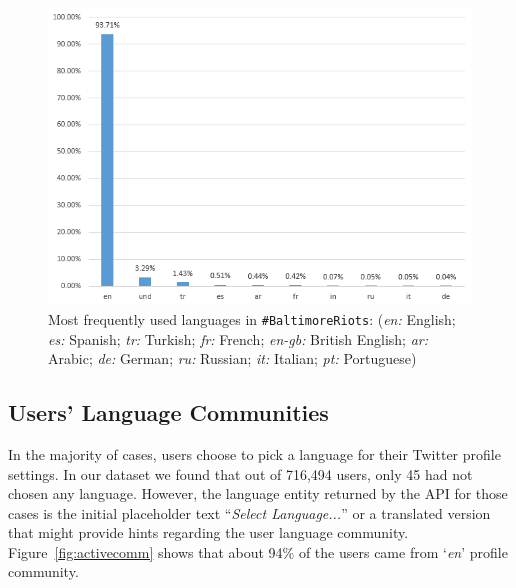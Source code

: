\documentclass[conference]{IEEEtran}
\begin{document}
\begin{figure}[!htb]
\centering
\includegraphics[width=\columnwidth]{images/langfreq.png}
\caption{Most frequently used languages in
  {\texttt{\#BaltimoreRiots}}: 
({\emph{en:}} English; {\emph{es:}} Spanish; {\emph{tr:}} Turkish;
  {\emph{fr:}} French; {\emph{en-gb:}} British English; {\emph{ar:}}
  Arabic; {\emph{de:}} German; {\emph{ru:}} Russian; {\emph{it:}}
  Italian; {\emph{pt:}} Portuguese)}
\label{fig:langfreq}
\end{figure}


\subsection{Users' Language Communities}

In the majority of cases, users choose to pick a language for their
Twitter profile settings. In our dataset we found that out of 716,494
users, only 45 had not chosen any language. However, the language
entity returned by the API for those cases is the initial placeholder
text ``{\emph{Select Language...}}'' or a translated version that might provide
hints regarding the user language
community. Figure~\ref{fig:activecomm} shows that about 94\% of the
users came from `{\emph{en}}' profile community.
\end{document}
